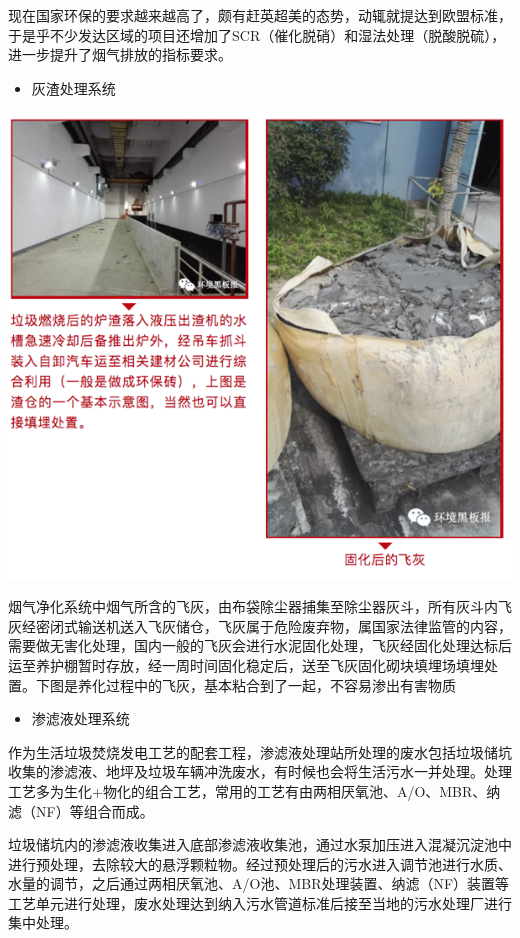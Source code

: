 \documentclass[]{book}
\providecommand{\tightlist}{%
  \setlength{\itemsep}{0pt}\setlength{\parskip}{0pt}}
\begin{document}
现在国家环保的要求越来越高了，颇有赶英超美的态势，动辄就提达到欧盟标准，于是乎不少发达区域的项目还增加了SCR（催化脱硝）和湿法处理（脱酸脱硫），进一步提升了烟气排放的指标要求。

\begin{itemize}
\tightlist
\item
  灰渣处理系统
\end{itemize}

\includegraphics[width=8.33in]{images/ljfs8}

烟气净化系统中烟气所含的飞灰，由布袋除尘器捕集至除尘器灰斗，所有灰斗内飞灰经密闭式输送机送入飞灰储仓，飞灰属于危险废弃物，属国家法律监管的内容，需要做无害化处理，国内一般的飞灰会进行水泥固化处理，飞灰经固化处理达标后运至养护棚暂时存放，经一周时间固化稳定后，送至飞灰固化砌块填埋场填埋处置。下图是养化过程中的飞灰，基本粘合到了一起，不容易渗出有害物质

\begin{itemize}
\tightlist
\item
  渗滤液处理系统
\end{itemize}

作为生活垃圾焚烧发电工艺的配套工程，渗滤液处理站所处理的废水包括垃圾储坑收集的渗滤液、地坪及垃圾车辆冲洗废水，有时候也会将生活污水一并处理。处理工艺多为生化+物化的组合工艺，常用的工艺有由两相厌氧池、A/O、MBR、纳滤（NF）等组合而成。

垃圾储坑内的渗滤液收集进入底部渗滤液收集池，通过水泵加压进入混凝沉淀池中进行预处理，去除较大的悬浮颗粒物。经过预处理后的污水进入调节池进行水质、水量的调节，之后通过两相厌氧池、A/O池、MBR处理装置、纳滤（NF）装置等工艺单元进行处理，废水处理达到纳入污水管道标准后接至当地的污水处理厂进行集中处理。
\end{document}
